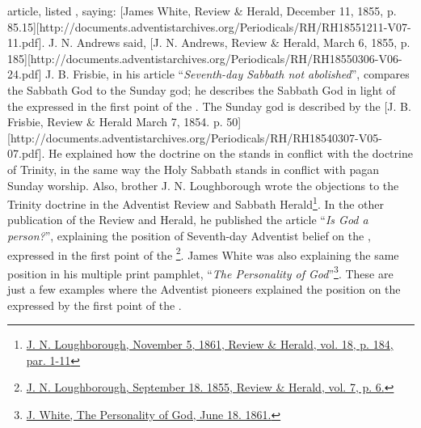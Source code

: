 article, listed , saying: [James White, Review \& Herald, December 11, 1855, p. 85.15][http://documents.adventistarchives.org/Periodicals/RH/RH18551211-V07-11.pdf]. J. N. Andrews said, [J. N. Andrews, Review \& Herald, March 6, 1855, p. 185][http://documents.adventistarchives.org/Periodicals/RH/RH18550306-V06-24.pdf] J. B. Frisbie, in his article “\textit{Seventh-day Sabbath not abolished}”, compares the Sabbath God to the Sunday god; he describes the Sabbath God in light of the  expressed in the first point of the . The Sunday god is described by the [J. B. Frisbie, Review \& Herald March 7, 1854. p. 50][http://documents.adventistarchives.org/Periodicals/RH/RH18540307-V05-07.pdf]. He explained how the doctrine on the  stands in conflict with the doctrine of Trinity, in the same way the Holy Sabbath stands in conflict with pagan Sunday worship. Also, brother J. N. Loughborough wrote the objections to the Trinity doctrine in the Adventist Review and Sabbath Herald\footnote{\href{https://adventistdigitallibrary.org/adl-349160/advent-review-and-sabbath-herald-november-5-1861}{J. N. Loughborough, November 5, 1861, Review \& Herald, vol. 18, p. 184, par. 1-11}}. In the other publication of the Review and Herald, he published the article “\textit{Is God a person?}”, explaining the position of Seventh-day Adventist belief on the , expressed in the first point of the \footnote{\href{http://documents.adventistarchives.org/Periodicals/RH/RH18550918-V07-06.pdf}{J. N. Loughborough, September 18. 1855, Review \& Herald, vol. 7, p. 6.}}. James White was also explaining the same position in his multiple print pamphlet, “\textit{The Personality of God}”\footnote{\href{https://egwwritings.org/?ref=en_PERGO.1.1&para=1471.3}{J. White, The Personality of God, June 18. 1861.}}. These are just a few examples where the Adventist pioneers explained the position on the  expressed by the first point of the .


